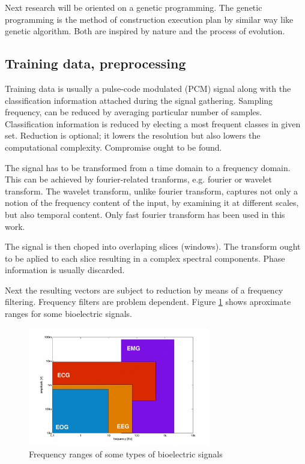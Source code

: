 \documentclass[a4paper,jurnal]{IEEEtran}
\begin{document}
Next research will be oriented on a genetic programming. The genetic programming 
is the method of construction execution plan by similar way like genetic
algorithm. Both are inspired by nature and the process of evolution.


\subsection{Training data, preprocessing}
Training data is usually a pulse-code modulated (PCM) signal \cite{pcm} along with the
classification information attached during the signal gathering.
Sampling frequency,
can be reduced by averaging particular number of samples. Classification
information is reduced by electing a most frequent classes in given set.
Reduction is optional; it lowers the resolution but also lowers the 
computational complexity. Compromise ought to be found.

The signal has to be transformed %
from a time domain to a frequency domain.
This can be achieved by fourier-related tranforms, e.g. fourier\cite{fourier} or
wavelet\cite{wavelet} transform.
The wavelet transform, unlike fourier transform, captures not only a notion of the 
frequency content of the input,
by examining it at different scales, but also temporal content.
Only fast fourier transform has been used in this work.

The signal is then choped into overlaping slices (windows).
The transform ought to be aplied to each slice resulting in
a complex spectral components.
Phase information is usually discarded.

Next the resulting vectors are subject to reduction by means of a
frequency filtering. Frequency filters are problem dependent.
Figure \ref{fig:filters2} shows aproximate ranges for some bioelectric signals.
\begin{figure}[h]
	\centering
	\includegraphics[width=80mm]{filters2}
	\caption{Frequency ranges of some types of bioelectric signals}
	\label{fig:filters2}
\end{figure}
\end{document}
